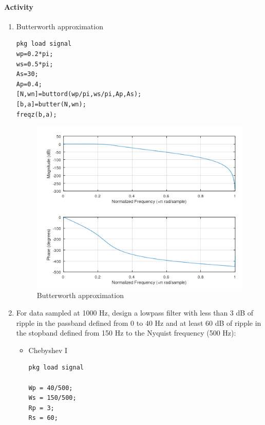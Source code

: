 \documentclass[12pt]{article}
\begin{document}
\paragraph{Activity}
\begin{enumerate}
    \item Butterworth approximation
    \begin{Verbatim}[frame = single]
pkg load signal
wp=0.2*pi;
ws=0.5*pi;
As=30;
Ap=0.4;
[N,wn]=buttord(wp/pi,ws/pi,Ap,As);
[b,a]=butter(N,wn);
freqz(b,a);
    \end{Verbatim}
    \begin{figure}[h!]
        \centering
        \includegraphics{labss/Lab6_1.PNG}
        \caption{Butterworth approximation}
    \end{figure}
    \item For data sampled at 1000 Hz, design a lowpass filter with less than 3 dB of ripple in the
    passband defined from 0 to 40 Hz and at least 60 dB of ripple in the stopband defined from 
    150 Hz to the Nyquist frequency (500 Hz):
    \begin{itemize}
        \item Chebyshev I
        \begin{Verbatim}[frame = single]
pkg load signal

Wp = 40/500;
Ws = 150/500;
Rp = 3;
Rs = 60;


\end{Verbatim}
\end{itemize}
\end{enumerate}
\end{document}
